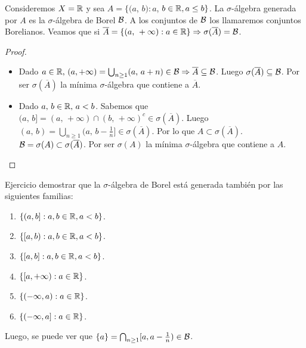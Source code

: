 \begin{eg}
    Consideremos $X = \mathbb{R}$ y sea $A = \{ (a$, $b) : a$, $b \in \mathbb{R}, a \leq b \}$. La $\sigma$-álgebra generada por $A$ es la $\sigma$-álgebra de Borel $\mathcal{B}$.
    A los conjuntos de $\mathcal{B}$ los llamaremos conjuntos Borelianos. Veamos que si $\overline{A} = \{ (a\text{, } +\infty) : a \in \mathbb{R} \} \Rightarrow \sigma(\overline{A}) = \mathcal{B}$.
    \begin{proof}
        \begin{itemize}
            \item Dado $a \in \mathbb{R}\text{, } (a, +\infty) = \bigcup_{n \geq 1} (a\text{, } a+n) \in \mathcal{B} \Rightarrow \overline{A} \subseteq \mathcal{B}$.
                  Luego $\sigma(\overline{A}) \subseteq \mathcal{B}$. Por ser $\sigma(\overline{A})$ la mínima $\sigma$-álgebra que contiene a $\overline{A}$.
            \item Dado $a\text{, } b \in \mathbb{R} \text{, } a < b$. Sabemos que $(a\text{, } b] = (a\text{, } +\infty) \cap (b\text{, } +\infty)^c \in \sigma(\overline{A})$.
                  Luego $(a\text{, } b) = \bigcup_{n \geq 1} (a\text{, } b - \frac{1}{n}] \in \sigma(\overline{A})$. Por lo que $A \subset \sigma(\overline{A})$.
                  $\mathcal{B} = \sigma(A) \subset \sigma(\overline{A})$. Por ser $\sigma(A)$ la mínima $\sigma$-álgebra que contiene a $A$.
        \end{itemize}
    \end{proof}
\end{eg}

Ejercicio demostrar que la $\sigma$-álgebra de Borel está generada también por las siguientes familias:

\begin{enumerate}
    \item $\{ (a, b] : a, b \in \mathbb{R}, a < b \}$.
    \item $\{ [a, b) : a, b \in \mathbb{R}, a < b \}$.
    \item $\{ [a, b] : a, b \in \mathbb{R}, a < b \}$.
    \item $\{ [a, +\infty) : a \in \mathbb{R} \}$.
    \item $\{ (-\infty, a) : a \in \mathbb{R} \}$.
    \item $\{ (-\infty, a] : a \in \mathbb{R} \}$.
\end{enumerate}

Luego, se puede ver que $\{ a \} = \bigcap_{n \geq 1} [a, a - \frac{1}{n}) \in \mathcal{B}$.